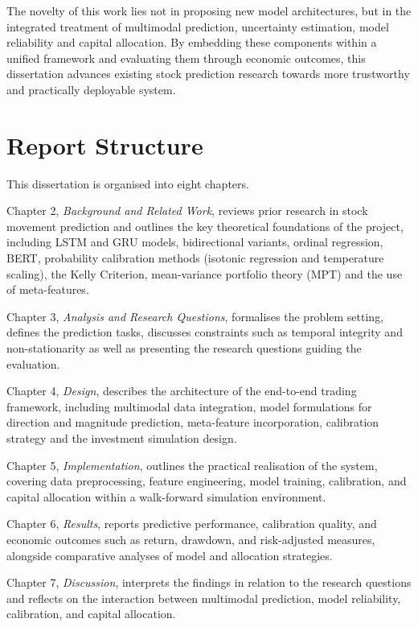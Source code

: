 \documentclass{l4proj}
\begin{document}
The novelty of this work lies not in proposing new model architectures, but in the integrated treatment of multimodal prediction, uncertainty estimation, model reliability and capital allocation. By embedding these components within a unified framework and evaluating them through economic outcomes, this dissertation advances existing stock prediction research towards more trustworthy and practically deployable system.

\section{Report Structure}

This dissertation is organised into eight chapters.

Chapter 2, \textit{Background and Related Work}, reviews prior research in stock movement prediction and outlines the key theoretical foundations of the project, including LSTM and GRU models, bidirectional variants, ordinal regression, BERT, probability calibration methods (isotonic regression and temperature scaling), the Kelly Criterion, mean-variance portfolio theory (MPT) and the use of meta-features.

Chapter 3, \textit{Analysis and Research Questions}, formalises the problem setting, defines the prediction tasks, discusses constraints such as temporal integrity and non-stationarity as well as presenting the research questions guiding the evaluation.

Chapter 4, \textit{Design}, describes the architecture of the end-to-end trading framework, including multimodal data integration, model formulations for direction and magnitude prediction, meta-feature incorporation, calibration strategy and the investment simulation design.

Chapter 5, \textit{Implementation}, outlines the practical realisation of the system, covering data preprocessing, feature engineering, model training, calibration, and capital allocation within a walk-forward simulation environment.

Chapter 6, \textit{Results}, reports predictive performance, calibration quality, and economic outcomes such as return, drawdown, and risk-adjusted measures, alongside comparative analyses of model and allocation strategies.

Chapter 7, \textit{Discussion}, interprets the findings in relation to the research questions and reflects on the interaction between multimodal prediction, model reliability, calibration, and capital allocation.
\end{document}
